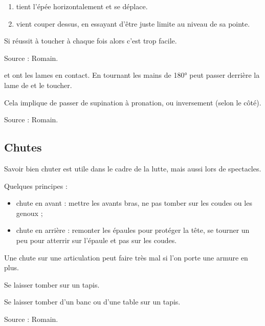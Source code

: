 \begin{exercice}

\begin{enumerate}
	\item \D tient l'épée horizontalement et se déplace.
	
	\item \A vient couper dessus, en essayant d'être juste limite au niveau de sa pointe.
\end{enumerate}

Si \A réussit à toucher à chaque fois alors c'est trop facile.

Source : Romain.

\end{exercice}


\begin{technique}
\label{struct:tech:changement-ligne}

\A et \D ont les lames en contact.
En tournant les mains de 180° \A peut passer derrière la lame de \D et le toucher.

Cela implique de passer de supination à pronation, ou inversement (selon le côté).

Source : Romain.
\end{technique}


\subsection{Chutes}

Savoir bien chuter est utile dans le cadre de la lutte, mais aussi lors de spectacles.

Quelques principes :
\begin{itemize}
	\item chute en avant : mettre les avants bras, ne pas tomber sur les coudes ou les genoux ;
	\item chute en arrière : remonter les épaules pour protéger la tête, se tourner un peu pour atterrir sur l'épaule et pas sur les coudes.
\end{itemize}
Une chute sur une articulation peut faire très mal si l'on porte une armure en plus.


\begin{exercice}[Chute]

Se laisser tomber sur un tapis.

\end{exercice}


\begin{exercice}

Se laisser tomber d'un banc ou d'une table sur un tapis.

Source : Romain.

\end{exercice}


